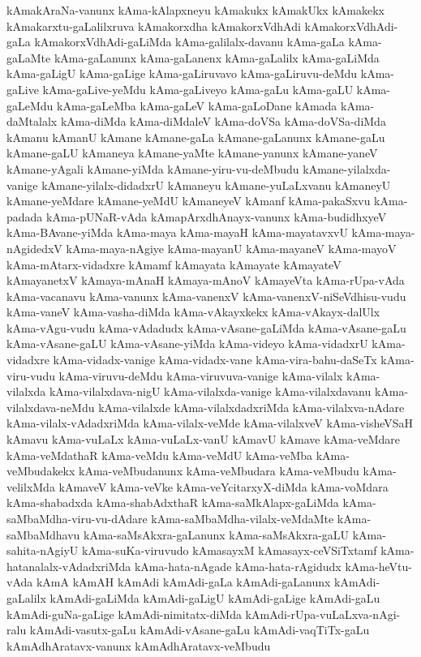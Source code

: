 {kAmakAraNa-vanunx
kAma-kAlapxneyu
kAmakukx
kAmakUkx
kAmakekx
kAmakarxtu-gaLalilxruva
kAmakorxdha
kAmakorxVdhAdi
kAmakorxVdhAdi-gaLa
kAmakorxVdhAdi-gaLiMda
kAma-galilalx-davanu
kAma-gaLa
kAma-gaLaMte
kAma-gaLanunx
kAma-gaLanenx
kAma-gaLalilx
kAma-gaLiMda
kAma-gaLigU
kAma-gaLige
kAma-gaLiruvavo
kAma-gaLiruvu-deMdu
kAma-gaLive
kAma-gaLive-yeMdu
kAma-gaLiveyo
kAma-gaLu
kAma-gaLU
kAma-gaLeMdu
kAma-gaLeMba
kAma-gaLeV
kAma-gaLoDane
kAmada
kAma-daMtalalx
kAma-diMda
kAma-diMdaleV
kAma-doVSa
kAma-doVSa-diMda
kAmanu
kAmanU
kAmane
kAmane-gaLa
kAmane-gaLanunx
kAmane-gaLu
kAmane-gaLU
kAmaneya
kAmane-yaMte
kAmane-yanunx
kAmane-yaneV
kAmane-yAgali
kAmane-yiMda
kAmane-yiru-vu-deMbudu
kAmane-yilalxda-vanige
kAmane-yilalx-didadxrU
kAmaneyu
kAmane-yuLaLxvanu
kAmaneyU
kAmane-yeMdare
kAmane-yeMdU
kAmaneyeV
kAmanf
kAma-pakaSxvu
kAma-padada
kAma-pUNaR-vAda
kAmapArxdhAnayx-vanunx
kAma-budidhxyeV
kAma-BAvane-yiMda
kAma-maya
kAma-mayaH
kAma-mayatavxvU
kAma-maya-nAgidedxV
kAma-maya-nAgiye
kAma-mayanU
kAma-mayaneV
kAma-mayoV
kAma-mAtarx-vidadxre
kAmamf
kAmayata
kAmayate
kAmayateV
kAmayanetxV
kAmaya-mAnaH
kAmaya-mAnoV
kAmayeVta
kAma-rUpa-vAda
kAma-vacanavu
kAma-vanunx
kAma-vanenxV
kAma-vanenxV-niSeVdhisu-vudu
kAma-vaneV
kAma-vasha-diMda
kAma-vAkayxkekx
kAma-vAkayx-dalUlx
kAma-vAgu-vudu
kAma-vAdadudx
kAma-vAsane-gaLiMda
kAma-vAsane-gaLu
kAma-vAsane-gaLU
kAma-vAsane-yiMda
kAma-videyo
kAma-vidadxrU
kAma-vidadxre
kAma-vidadx-vanige
kAma-vidadx-vane
kAma-vira-bahu-daSeTx
kAma-viru-vudu
kAma-viruvu-deMdu
kAma-viruvuva-vanige
kAma-vilalx
kAma-vilalxda
kAma-vilalxdava-nigU
kAma-vilalxda-vanige
kAma-vilalxdavanu
kAma-vilalxdava-neMdu
kAma-vilalxde
kAma-vilalxdadxriMda
kAma-vilalxva-nAdare
kAma-vilalx-vAdadxriMda
kAma-vilalx-veMde
kAma-vilalxveV
kAma-visheVSaH
kAmavu
kAma-vuLaLx
kAma-vuLaLx-vanU
kAmavU
kAmave
kAma-veMdare
kAma-veMdathaR
kAma-veMdu
kAma-veMdU
kAma-veMba
kAma-veMbudakekx
kAma-veMbudanunx
kAma-veMbudara
kAma-veMbudu
kAma-velilxMda
kAmaveV
kAma-veVke
kAma-veYcitarxyX-diMda
kAma-voMdara
kAma-shabadxda
kAma-shabAdxthaR
kAma-saMkAlapx-gaLiMda
kAma-saMbaMdha-viru-vu-dAdare
kAma-saMbaMdha-vilalx-veMdaMte
kAma-saMbaMdhavu
kAma-saMsAkxra-gaLanunx
kAma-saMsAkxra-gaLU
kAma-sahita-nAgiyU
kAma-suKa-viruvudo
kAmasayxM
kAmasayx-ceVSiTxtamf
kAma-hatanalalx-vAdadxriMda
kAma-hata-nAgade
kAma-hata-rAgidudx
kAma-heVtu-vAda
kAmA
kAmAH
kAmAdi
kAmAdi-gaLa
kAmAdi-gaLanunx
kAmAdi-gaLalilx
kAmAdi-gaLiMda
kAmAdi-gaLigU
kAmAdi-gaLige
kAmAdi-gaLu
kAmAdi-guNa-gaLige
kAmAdi-nimitatx-diMda
kAmAdi-rUpa-vuLaLxva-nAgi-ralu
kAmAdi-vasutx-gaLu
kAmAdi-vAsane-gaLu
kAmAdi-vaqTiTx-gaLu
kAmAdhAratavx-vanunx
kAmAdhAratavx-veMbudu
}
